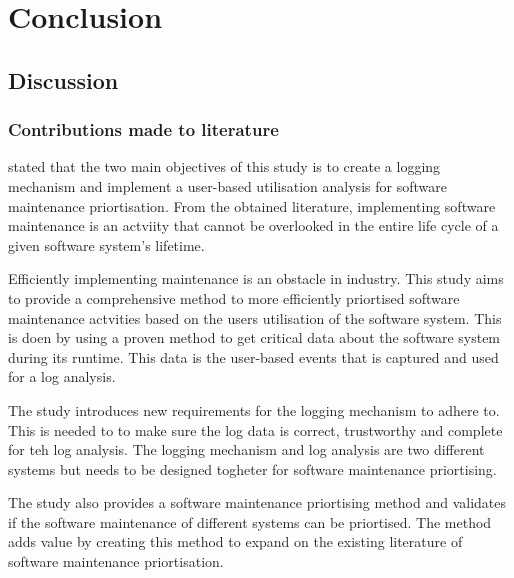 \chapter{Conclusion}
\label{chap:4}

\section{Discussion}

\subsection{Contributions made to literature}
 stated that the two main objectives of this study is to create a logging mechanism and implement a user-based utilisation analysis for software maintenance priortisation. From the obtained literature, implementing software maintenance is an actviity that cannot be overlooked in the entire life cycle of a given software system's lifetime. \par Efficiently implementing maintenance is an obstacle in industry. This study aims to provide a comprehensive method to more efficiently priortised software maintenance actvities based on the users utilisation of the software system. This is doen by using a proven method to get critical data about the software system during its runtime. This data is the user-based events that is captured and used for a log analysis.\par The study introduces new requirements for the logging mechanism to adhere to. This is needed to to make sure the log data is correct, trustworthy and complete for teh log analysis. The logging mechanism and log analysis are two different systems but needs to be designed togheter for software maintenance priortising.\par The study also provides a software maintenance priortising method and validates if the software maintenance of different systems can be priortised. The method adds value by creating this method to expand on the existing literature of software maintenance priortisation.

